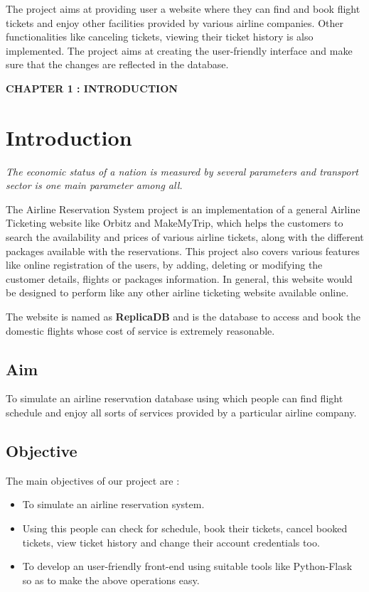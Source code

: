 \documentclass[hidelinks=true]{article}
\begin{document}
The project aims at providing user a website where they can find and book flight tickets and enjoy other facilities provided by various airline companies. Other functionalities like canceling tickets, viewing their ticket history is also implemented. The project aims at creating the user-friendly interface and make sure that the changes are reflected in the database.
\pagebreak
\begin{center}
\vspace*{\fill}
\LARGE{\textbf{CHAPTER 1 : INTRODUCTION}}
\vspace*{\fill}
\end{center}





\pagebreak

\section{Introduction}

\large \emph{The economic status of a nation is measured by several parameters and transport sector is one main parameter among all.}
\vspace*{10pt}

The Airline Reservation System project is an implementation of a general Airline
Ticketing website like Orbitz and MakeMyTrip, which helps the customers to search the availability and prices of various airline tickets, along with the different packages available with the reservations. This project also covers various features like online registration of the users, by adding, deleting or modifying the customer details, flights or packages information. In general, this website would be designed to perform like any other airline ticketing website available online. 
\vspace*{10pt}

The website is named as \textbf{ReplicaDB} and is the database to access and book the domestic flights whose cost of service is extremely reasonable.

\subsection{Aim}

To simulate an airline reservation database using which people can find flight schedule and enjoy all sorts of services provided by a particular airline company.

\subsection{Objective}
The main objectives of our project are :
\begin{itemize}
\item {To simulate an airline reservation system.}
\item{Using this people can check for schedule, book their tickets, cancel booked tickets, view ticket history and change their account credentials too.}
\item {To develop an user-friendly front-end using suitable tools like Python-Flask so as to make the above operations easy.}
\end{itemize}
\pagebreak
\end{document}
